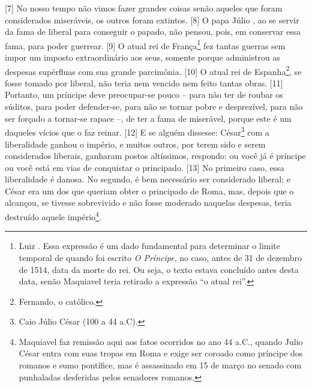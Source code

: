 {[}7{]} No nosso tempo não vimos fazer grandes coisas senão aqueles que
foram considerados miseráveis, os outros foram extintos. {[}8{]} O papa
Júlio , ao se servir da fama de liberal para conseguir o papado, não
pensou, pois, em conservar essa fama, para poder guerrear. {[}9{]} O
atual rei de França\footnote{Luiz . Essa expressão é um dado
  fundamental para determinar o limite temporal de quando foi escrito
  \emph{O Príncipe}, no caso, antes de 31 de dezembro de 1514, data da
  morte do rei. Ou seja, o texto estava concluído antes desta data,
  senão Maquiavel teria retirado a expressão ``o atual rei''.} fez
tantas guerras sem impor um imposto extraordinário aos seus, somente
porque administrou as despesas supérfluas com sua grande parcimônia.
{[}10{]} O atual rei de Espanha\footnote{Fernando, o católico.}, se
fosse tomado por liberal, não teria nem vencido nem feito tantas obras.
{[}11{]} Portanto, um príncipe deve preocupar-se pouco -- para não ter
de roubar os súditos, para poder defender-se, para não se tornar pobre e
desprezível, para não ser forçado a tornar-se rapace --, de ter a fama
de miserável, porque este é um daqueles vícios que o faz reinar.
{[}12{]} E se alguém dissesse: César\footnote{Caio Júlio César (100 a 44
  a.C).} com a liberalidade ganhou o império, e muitos outros, por terem
sido e serem considerados liberais, ganharam postos altíssimos,
respondo: ou você já é príncipe ou você está em vias de conquistar o
principado. {[}13{]} No primeiro caso, essa liberalidade é danosa. No
segundo, é bem necessário ser considerado liberal; e César era um dos
que queriam obter o principado de Roma, mas, depois que o alcançou, se
tivesse sobrevivido e não fosse moderado naquelas despesas, teria
destruído aquele império\footnote{Maquiavel faz remissão aqui aos fatos
  ocorridos no ano 44 a.C., quando Julio César entra com suas tropas em
  Roma e exige ser coroado como príncipe dos romanos e sumo pontífice,
  mas é assassinado em 15 de março no senado com punhaladas desferidas
  pelos senadores romanos.}.

